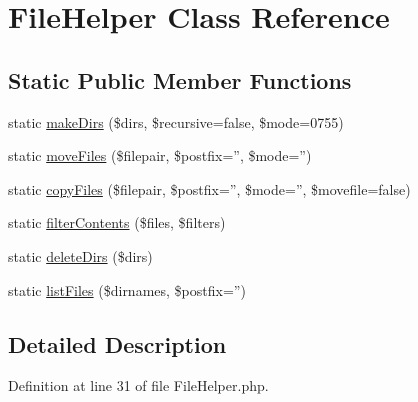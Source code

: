 \hypertarget{class_utopia_1_1_components_1_1_helper_1_1_file_helper}{
\section{FileHelper Class Reference}
\label{class_utopia_1_1_components_1_1_helper_1_1_file_helper}
}
\subsection*{Static Public Member Functions}
\begin{DoxyCompactItemize}
\item 
static \hyperlink{class_utopia_1_1_components_1_1_helper_1_1_file_helper_a120d63e8bda7f13312e93cb1f254326a}{makeDirs} (\$dirs, \$recursive=false, \$mode=0755)
\item 
static \hyperlink{class_utopia_1_1_components_1_1_helper_1_1_file_helper_a5e41180789a0172eb575841af21e48c1}{moveFiles} (\$filepair, \$postfix='', \$mode='')
\item 
static \hyperlink{class_utopia_1_1_components_1_1_helper_1_1_file_helper_a3dbfee6e10446b5b846caefd7e860c5e}{copyFiles} (\$filepair, \$postfix='', \$mode='', \$movefile=false)
\item 
static \hyperlink{class_utopia_1_1_components_1_1_helper_1_1_file_helper_a684fc0c02b8b8229b2a64861ec29eac8}{filterContents} (\$files, \$filters)
\item 
static \hyperlink{class_utopia_1_1_components_1_1_helper_1_1_file_helper_a639558aae1d647043b608fdbf13484a5}{deleteDirs} (\$dirs)
\item 
static \hyperlink{class_utopia_1_1_components_1_1_helper_1_1_file_helper_a15eb6a9afa2897cb986edc27cf08cf3d}{listFiles} (\$dirnames, \$postfix='')
\end{DoxyCompactItemize}


\subsection{Detailed Description}


Definition at line 31 of file FileHelper.php.



